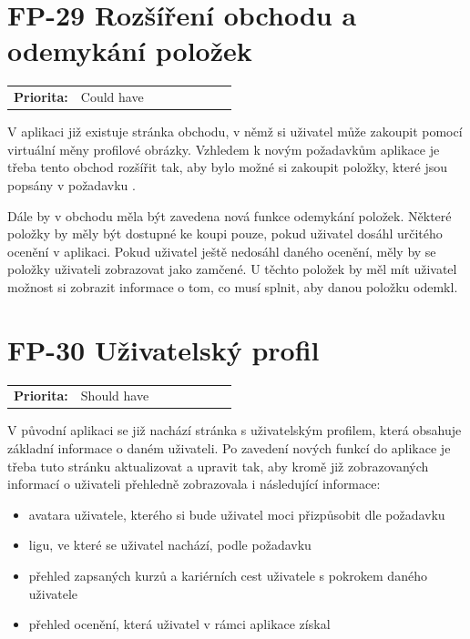 \section{FP-29 Rozšíření obchodu a odemykání položek}\label{sec:fp-shop-unlock-items}

\begin{tabular}{lp{0.7\linewidth}}
    \textbf{Priorita:} & Could have \\
\end{tabular}

V aplikaci již existuje stránka obchodu, v němž si uživatel může zakoupit pomocí virtuální měny profilové obrázky. Vzhledem k novým požadavkům aplikace je třeba tento obchod rozšířit tak, aby bylo možné si zakoupit položky, které jsou popsány v požadavku .

Dále by v obchodu měla být zavedena nová funkce odemykání položek. Některé položky by měly být dostupné ke koupi pouze, pokud uživatel dosáhl určitého ocenění v aplikaci. Pokud uživatel ještě nedosáhl daného ocenění, měly by se položky uživateli zobrazovat jako zamčené. U těchto položek by měl mít uživatel možnost si zobrazit informace o tom, co musí splnit, aby danou položku odemkl.

\section{FP-30 Uživatelský profil}\label{sec:fp-user-profile}

\begin{tabular}{lp{0.7\linewidth}}
    \textbf{Priorita:} & Should have \\
\end{tabular}

V původní aplikaci se již nachází stránka s uživatelským profilem, která obsahuje základní informace o daném uživateli. Po zavedení nových funkcí do aplikace je třeba tuto stránku aktualizovat a upravit tak, aby kromě již zobrazovaných informací o uživateli přehledně zobrazovala i následující informace:

\begin{itemize}
    \item avatara uživatele, kterého si bude uživatel moci přizpůsobit dle požadavku 
    \item ligu, ve které se uživatel nachází, podle požadavku 
    \item přehled zapsaných kurzů a kariérních cest uživatele s pokrokem daného uživatele
    \item přehled ocenění, která uživatel v rámci aplikace získal
\end{itemize}

